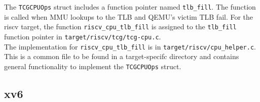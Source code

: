 


The \texttt{TCGCPUOps} struct includes a function pointer named \texttt{tlb\_fill}. The function is called
when MMU lookups to the TLB and QEMU's victim TLB fail.
For the riscv target, the function \texttt{riscv\_cpu\_tlb\_fill} is assigned to the \texttt{tlb\_fill}
function pointer in \texttt{target/riscv/tcg/tcg-cpu.c}.\\
The implementation for \texttt{riscv\_cpu\_tlb\_fill} is in \texttt{target/riscv/cpu\_helper.c}. This is a common
file to be found in a target-specifc directory and contains general functionality to implement the \texttt{TCGCPUOps} struct.\\




\subsection{xv6}




